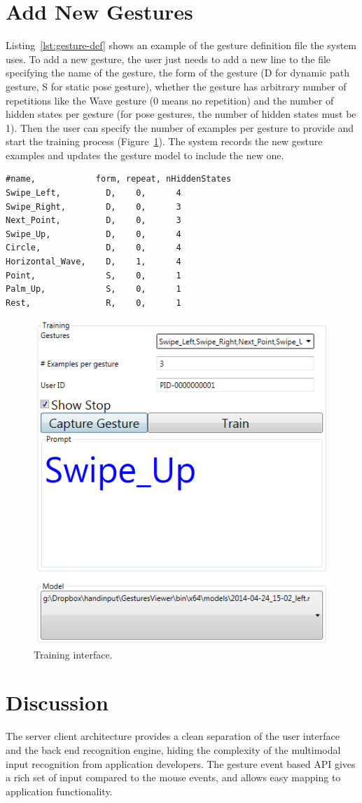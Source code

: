 \section{Add New Gestures}
Listing~\ref{lst:gesture-def} shows an example of the gesture definition file
the system uses. To add a new gesture, the user just needs to add a new line to
the file specifying the name of the gesture, the form of the gesture (D for
dynamic path gesture, S for static pose gesture), whether the gesture has
arbitrary number of repetitions like the Wave gesture (0 means no repetition)
and the number of hidden states per gesture (for pose gestures, the number of hidden states must be 1).
Then the user can specify the number of examples per gesture to provide and
start the training process (Figure~\ref{fig:training}).
The system records the new gesture examples and updates the gesture model to
include the new one.

\newpage
\begin{lstlisting}[caption={Gesture definition file.},
label={lst:gesture-def}] 
#name,            form, repeat, nHiddenStates
Swipe_Left,         D,    0,      4
Swipe_Right,        D,    0,      3
Next_Point,         D,    0,      3
Swipe_Up,           D,    0,      4
Circle,             D,    0,      4
Horizontal_Wave,    D,    1,      4
Point,              S,    0,      1
Palm_Up,            S,    0,      1
Rest,               R,    0,      1
\end{lstlisting}

\begin{figure}[tbh]
\centering
\includegraphics[width=0.5\columnwidth]{figures/training_interface.PNG}
\caption{Training interface.}
\label{fig:training}
\end{figure}

\section{Discussion}
The server client architecture provides a clean separation of the user
interface and the back end recognition engine, hiding the complexity of the
multimodal input recognition from application developers. The gesture event
based API gives a rich set of input compared to the mouse events, and allows
easy mapping to application functionality.


